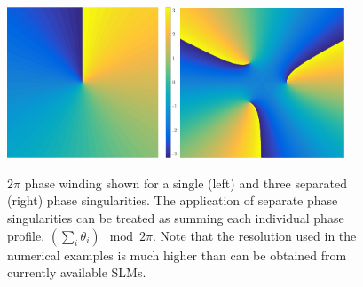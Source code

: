 \begin{figure}\centering
    \includegraphics[width=0.45\textwidth]{Images/ch4_vtx/2pi.pdf}
    \includegraphics[width=0.435\textwidth]{Images/ch4_vtx/3_2pi.pdf}
    \caption{$2\pi$ phase winding shown for a single (left) and three separated (right) phase singularities. The application of separate phase singularities can be treated as summing each individual phase profile, $\left(\displaystyle\sum\limits_i \theta_i \right)\mod 2\pi$. Note that the resolution used in the numerical examples is much higher than can be obtained from currently available SLMs.}\label{fig:atan2phase}
\end{figure}

